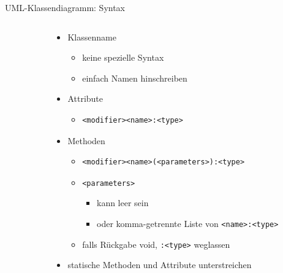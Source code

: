 \documentclass[18pt]{beamer}
\begin{document}
	\begin{frame}[fragile]{UML-Klassendiagramm: Syntax}
	\begin{columns}
		\begin{column}{0.25\textwidth}
		\end{column}%
		\begin{column}{0.75\textwidth}
			\begin{itemize}
				\item Klassenname
				\begin{itemize}
					\item keine spezielle Syntax
					\item einfach Namen hinschreiben
				\end{itemize}
				\item Attribute
				\begin{itemize}
					\item \begin{verbatim}<modifier><name>:<type>\end{verbatim} 
				\end{itemize} 
				\item Methoden
				\begin{itemize}
					\item \begin{verbatim}<modifier><name>(<parameters>):<type>\end{verbatim}
					\item \verb|<parameters>|
					\begin{itemize}
						\item kann leer sein
						\item oder komma-getrennte Liste von \verb|<name>:<type>|
					\end{itemize}
					\item falls Rückgabe void, \verb|:<type>| weglassen
					
				\end{itemize} 
			\item statische Methoden und Attribute unterstreichen
			\end{itemize}
		\end{column}
	\end{columns}
\end{frame}
\end{document}
